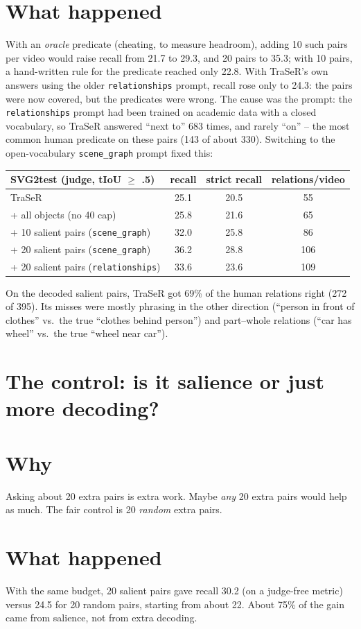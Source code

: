 \documentclass[11pt,openany]{book}
\newcommand{\code}[1]{\texttt{#1}}
\newcommand{\wsec}{\section*{Why}}
\newcommand{\hsec}{\section*{What happened}}
\begin{document}
\hsec
With an \emph{oracle} predicate (cheating, to measure headroom), adding 10 such pairs per video would raise recall from 21.7 to
29.3, and 20 pairs to 35.3; with 10 pairs, a hand-written rule for the predicate reached only 22.8. With TraSeR's own answers using the older \code{relationships}
prompt, recall rose only to 24.3: the pairs were now covered, but the predicates were wrong. The cause was the prompt: the
\code{relationships} prompt had been trained on academic data with a closed vocabulary, so TraSeR answered ``next to'' 683 times,
and rarely ``on'' -- the most common human predicate on these pairs (143 of about 330). Switching to the open-vocabulary
\code{scene\_graph} prompt fixed this:

\begin{center}
\begin{tabular}{@{}lccc@{}}
\toprule
SVG2test (judge, tIoU $\ge$ .5) & recall & strict recall & relations/video \\
\midrule
TraSeR & 25.1 & 20.5 & 55 \\
+ all objects (no 40 cap) & 25.8 & 21.6 & 65 \\
+ 10 salient pairs (\code{scene\_graph}) & 32.0 & 25.8 & 86 \\
+ 20 salient pairs (\code{scene\_graph}) & 36.2 & 28.8 & 106 \\
+ 20 salient pairs (\code{relationships}) & 33.6 & 23.6 & 109 \\
\bottomrule
\end{tabular}
\end{center}
On the decoded salient pairs, TraSeR got 69\% of the human relations right (272 of 395). Its misses were mostly phrasing in the
other direction (``person in front of clothes'' vs.\ the true ``clothes behind person'') and part--whole relations (``car has
wheel'' vs.\ the true ``wheel near car'').

\section{The control: is it salience or just more decoding?}
\wsec
Asking about 20 extra pairs is extra work. Maybe \emph{any} 20 extra pairs would help as much. The fair control is 20
\emph{random} extra pairs.

\hsec
With the same budget, 20 salient pairs gave recall 30.2 (on a judge-free metric) versus 24.5 for 20 random pairs, starting from
about 22. About 75\% of the gain came from salience, not from extra decoding.
\end{document}
